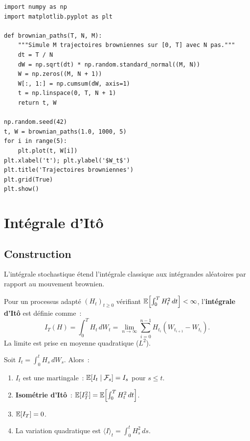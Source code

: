 \begin{codeblock}[title=\textbf{Simulation de trajectoires browniennes}]
\begin{verbatim}
import numpy as np
import matplotlib.pyplot as plt

def brownian_paths(T, N, M):
    """Simule M trajectoires browniennes sur [0, T] avec N pas."""
    dt = T / N
    dW = np.sqrt(dt) * np.random.standard_normal((M, N))
    W = np.zeros((M, N + 1))
    W[:, 1:] = np.cumsum(dW, axis=1)
    t = np.linspace(0, T, N + 1)
    return t, W

np.random.seed(42)
t, W = brownian_paths(1.0, 1000, 5)
for i in range(5):
    plt.plot(t, W[i])
plt.xlabel('t'); plt.ylabel('$W_t$')
plt.title('Trajectoires browniennes')
plt.grid(True)
plt.show()
\end{verbatim}
\end{codeblock}

\section{Int\'egrale d'It\^o}

\subsection{Construction}

L'int\'egrale stochastique \'etend l'int\'egrale classique aux int\'egrandes
al\'eatoires par rapport au mouvement brownien.

\begin{definition}
Pour un processus adapt\'e $(H_t)_{t \geq 0}$ v\'erifiant
$\mathbb{E}\!\left[\int_0^T H_t^2\,dt\right] < \infty$, l'\textbf{int\'egrale
d'It\^o} est d\'efinie comme~:
\[
    I_T(H) = \int_0^T H_t\,dW_t
           = \lim_{n \to \infty} \sum_{i=0}^{n-1}
             H_{t_i}(W_{t_{i+1}} - W_{t_i}).
\]
La limite est prise en moyenne quadratique ($L^2$).
\end{definition}

\begin{theoreme}
\label{thm:ito_integral_props}
Soit $I_t = \int_0^t H_s\,dW_s$. Alors~:
\begin{enumerate}
    \item $I_t$ est une martingale~: $\mathbb{E}[I_t \mid \mathcal{F}_s] = I_s$
          pour $s \leq t$.
    \item \textbf{Isom\'etrie d'It\^o}~:
          $\mathbb{E}[I_T^2] = \mathbb{E}\!\left[\int_0^T H_t^2\,dt\right]$.
    \item $\mathbb{E}[I_T] = 0$.
    \item La variation quadratique est
          $\langle I \rangle_t = \int_0^t H_s^2\,ds$.
\end{enumerate}
\end{theoreme}

